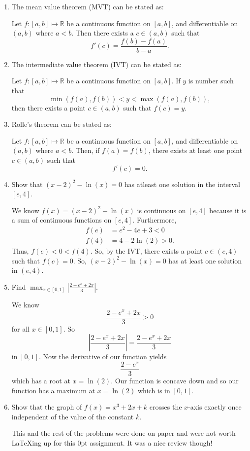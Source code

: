 \documentclass[a4paper,12pt]{article}
\newcommand{\reals}{\mathbb{R}}
\newcommand{\abs}[1]{\left| #1 \right|}
\begin{document}
\begin{enumerate}[label = \arabic*]
    \item The mean value theorem (MVT) can be stated as:
    
    Let $f : [a,b] \mapsto \reals$ be a continuous function on $[a,b]$, and differentiable on $(a,b)$ where $a < b$. Then there exists a $c \in (a,b)$ such that
    \[
        f'(c) = \frac{f(b) - f(a)}{b - a}.
    \]
    
    \item The intermediate value theorem (IVT) can be stated as:
    
    Let $f:[a,b] \mapsto \reals$ be a continuous function on $[a,b]$. If $y$ is number such that 
    \[
        \min(f(a), f(b)) < y < \max(f(a), f(b)),
    \]
    then there exists a point $c \in (a,b)$ such that $f(c) = y$.
    
    \item Rolle's theorem can be stated as:
    
    Let $f : [a,b] \mapsto \reals$ be a continuous function on $[a,b]$, and differentiable on $(a,b)$ where $a < b$. Then, if $f(a) = f(b)$, there exists at least one point $c \in (a,b)$ such that 
    \[
        f'(c) = 0.
    \]
    
    \item Show that $(x - 2)^2 - \ln(x) = 0$ has atleast one solution in the interval $[e,4]$.
    
    We know $f(x) = (x - 2)^2 - \ln(x)$ is continuous on $[e, 4]$ because it is a sum of continuous functions on $[e, 4]$. Furthermore, 
    \begin{align*}
        f(e) &= e^2 - 4e + 3 < 0 \\
        f(4) &= 4 - 2 \ln(2) > 0.
    \end{align*}
    Thus, $f(e) < 0 < f(4)$. So, by the IVT, there exists a point $c \in (e,4)$ such that $f(c) = 0$. So, $(x - 2)^2 - \ln(x) = 0$ has at least one solution in $(e,4)$.
    
    \item Find $\max_{x \in [0,1]} \abs{\frac{2 - e^x + 2x}{3}}$.
    
    We know 
    \[
        \frac{2 - e^x + 2x}{3} > 0
    \]
    for all $x \in [0,1]$. So
    \[
        \abs{\frac{2 - e^x + 2x}{3}} = \frac{2 - e^x + 2x}{3}
    \]
    in $[0,1]$. Now the derivative of our function yields
    \[
        \frac{2 - e^x}{3}
    \]
    which has a root at $x = \ln(2)$. Our function is concave down and so our function has a maximum at $x = \ln(2)$ which is in $[0,1]$.
    
    \item Show that the graph of $f(x) = x^3 + 2x + k$ crosses the $x$-axis exactly once independent of the value of the constant $k$.
    
    This and the rest of the problems were done on paper and were not worth \LaTeX ing up for this 0pt assignment. It was a nice review though!
\end{enumerate}
\end{document}
